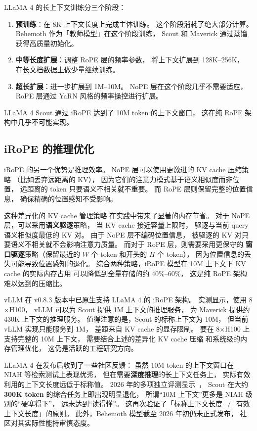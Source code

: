 \begin{keybox}
LLaMA 4 的长上下文训练分三个阶段：
\begin{enumerate}[noitemsep]
  \item \textbf{预训练}：在 8K 上下文长度上完成主体训练。
        这个阶段消耗了绝大部分计算。
        Behemoth 作为「教师模型」在这个阶段训练，
        Scout 和 Maverick 通过蒸馏获得高质量初始化。
  \item \textbf{中等长度扩展}：调整 RoPE 层的频率参数，
        将上下文扩展到 128K--256K，
        在长文档数据上做少量继续训练。
  \item \textbf{超长扩展}：进一步扩展到 1M--10M。
        NoPE 层在这个阶段几乎不需要适应，
        RoPE 层通过 YaRN 风格的频率操控进行扩展。
\end{enumerate}
LLaMA 4 Scout 通过 iRoPE 达到了 10M token 的上下文窗口，
这在纯 RoPE 架构中几乎不可能实现。
\end{keybox}

\subsection{iRoPE 的推理优化}

iRoPE 的另一个优势是推理效率。
NoPE 层可以使用更激进的 KV cache 压缩策略
（比如丢弃远距离的 KV），
因为它们的注意力模式基于语义相似度而非位置，
远距离的 token 只要语义不相关就不重要。
而 RoPE 层则保留完整的位置信息，
确保精确的位置感知不受影响。

这种差异化的 KV cache 管理策略
在实践中带来了显著的内存节省。
对于 NoPE 层，可以采用\textbf{语义驱逐}策略，
当 KV cache 接近容量上限时，
驱逐与当前 query 语义相似度最低的 KV 对。
由于 NoPE 层不编码位置信息，
被驱逐的 KV 对只要语义不相关就不会影响注意力质量。
而对于 RoPE 层，则需要采用更保守的
\textbf{窗口驱逐}策略（保留最近的 $W$ 个 token 和开头的 $H$ 个 token），
因为位置信息的丢失可能导致位置感知的退化。
综合两种策略，iRoPE 模型在 10M 上下文下
KV cache 的实际内存占用
可以降低到全量存储的约 40\%--60\%，
这是纯 RoPE 架构难以达到的压缩比。

vLLM 在 v0.8.3 版本中已原生支持 LLaMA 4 的 iRoPE 架构。
实测显示，使用 8$\times$H100，
vLLM 可以为 Scout 提供 1M 上下文的推理服务，
为 Maverick 提供约 430K 上下文的推理服务。
值得注意的是，Scout 的标称上下文为 10M，
但当前 vLLM 实现只能服务到 1M，
差距来自 KV cache 的显存限制。
要在 8$\times$H100 上支持完整的 10M 上下文，
需要结合上述的差异化 KV cache 压缩
和系统级的内存管理优化，
这仍是活跃的工程研究方向。

\begin{warnbox}
LLaMA 4 在发布后收到了一些社区反馈：
虽然 10M token 的上下文窗口在 NIAH 等检索测试上表现优秀，
但在需要\textbf{深度推理}的长上下文任务上，
实际有效利用的上下文长度远低于标称值。
2026 年的多项独立评测显示~\cite{llama4irope2026}，
Scout 在大约 \textbf{300K token} 的综合任务上即出现明显退化，
所谓“10M 上下文”更多是 NIAH 级别的“硬塞得下”，
远未达到“读得懂”。
这再次验证了「标称上下文长度 $\neq$ 有效上下文长度」的原则。
此外，Behemoth 模型截至 2026 年初仍未正式发布，
社区对其实际性能持审慎态度。
\end{warnbox}

